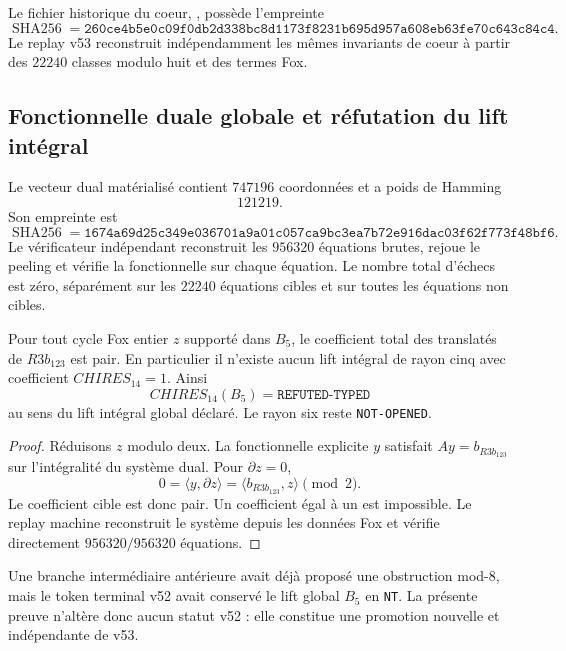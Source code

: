 Le fichier historique du coeur, , possède l'empreinte
\[
 \operatorname{SHA256}=\texttt{260ce4b5e0c09f0db2d338bc8d1173f8231b695d957a608eb63fe70c643c84c4}.
\]
Le replay v53 reconstruit indépendamment les mêmes invariants de coeur à partir des $22240$ classes modulo huit et des termes Fox.

\subsection{Fonctionnelle duale globale et réfutation du lift intégral}

Le vecteur dual matérialisé  contient $747196$ coordonnées et a poids de Hamming
\[
 121219.
\]
Son empreinte est
\[
 \operatorname{SHA256}=\texttt{1674a69d25c349e036701a9a01c057ca9bc3ea7b72e916dac03f62f773f48bf6}.
\]
Le vérificateur indépendant  reconstruit les $956320$ équations brutes, rejoue le peeling et vérifie la fonctionnelle sur chaque équation. Le nombre total d'échecs est zéro, séparément sur les $22240$ équations cibles et sur toutes les équations non cibles.

\begin{theorem}\label{thm:v53-chires14-mod8}
Pour tout cycle Fox entier $z$ supporté dans $B_5$, le coefficient total des translatés de $R3b_{123}$ est pair. En particulier il n'existe aucun lift intégral de rayon cinq avec coefficient $CHIRES_{14}=1$.
Ainsi
\[
 \boxed{
 CHIRES_{14}(B_5)=\texttt{REFUTED-TYPED}}
\]
au sens du lift intégral global déclaré. Le rayon six reste \texttt{NOT-OPENED}.
\end{theorem}

\begin{proof}
Réduisons $z$ modulo deux. La fonctionnelle explicite $y$ satisfait $Ay=b_{R3b_{123}}$ sur l'intégralité du système dual. Pour $\partial z=0$,
\[
 0=\langle y,\partial z\rangle
  =\langle b_{R3b_{123}},z\rangle\pmod2.
\]
Le coefficient cible est donc pair. Un coefficient égal à un est impossible. Le replay machine reconstruit le système depuis les données Fox et vérifie directement $956320/956320$ équations.
\end{proof}

\begin{guardrail}
Une branche intermédiaire antérieure avait déjà proposé une obstruction mod-8, mais le token terminal v52 avait conservé le lift global $B_5$ en \texttt{NT}. La présente preuve n'altère donc aucun statut v52 : elle constitue une promotion nouvelle et indépendante de v53.
\end{guardrail}

